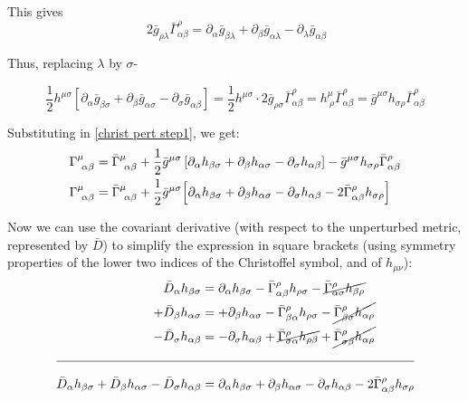 \documentclass[12pt, letterpaper]{report}
\begin{document}
This gives 
$$\ 2\bar{g}_{\rho\lambda}\bar{\Gamma}^{\rho}_{\alpha\beta}= \partial_\alpha \bar{g}_{\beta\lambda}+\partial_{\beta}\bar{g}_{\alpha\lambda}-\partial_{\lambda}\bar{g}_{\alpha\beta}$$ 

Thus, replacing $\lambda$ by $\sigma$-

\[
    \frac{1}{2}h^{\mu\sigma}\left[\partial_\alpha \bar{g}_{\beta\sigma}+\partial_{\beta}\bar{g}_{\alpha\sigma}-\partial_{\sigma}\bar{g}_{\alpha\beta}\right] = \frac{1}{2}h^{\mu\sigma}\cdot 2\bar{g}_{\rho\sigma}\bar{\Gamma}^{\rho}_{\alpha\beta}= h^{\mu}_{\ \rho}\bar{\Gamma}^{\rho}_{\alpha\beta}= \bar{g}^{\mu\sigma} h_{\sigma\rho}\bar{\Gamma}^{\rho}_{\alpha\beta}
\]

Substituting in \cref{christ pert step1}, we get: 
\setlength{\jot}{10pt}
\begin{align} 
    \Gamma^{\mu}_{\ \alpha\beta}&= \bar{\Gamma}^{\mu}_{\ \alpha\beta}+\frac{1}{2}\bar{g}^{\mu\sigma}\left[\partial_\alpha h_{\beta\sigma}+\partial_{\beta}h_{\alpha\sigma}-\partial_{\sigma}h_{\alpha\beta}\right]- \bar{g}^{\mu\sigma} h_{\sigma\rho}\bar{\Gamma}^{\rho}_{\alpha\beta} \nonumber\\
    \Gamma^{\mu}_{\ \alpha\beta}&= \bar{\Gamma}^{\mu}_{\ \alpha\beta}+\frac{1}{2}\bar{g}^{\mu\sigma}\qty[\partial_\alpha h_{\beta\sigma}+\partial_{\beta}h_{\alpha\sigma}-\partial_{\sigma}h_{\alpha\beta}- 2\bar{\Gamma}^{\rho}_{\alpha\beta}h_{\sigma\rho}]\label{christ pert step2}
\end{align}

Now we can use the covariant derivative (with respect to the unperturbed metric, represented by $\bar{D}$) to simplify the expression in square brackets (using symmetry properties of the lower two indices of the Christoffel symbol, and of $h_{\mu\nu}$): 
\setlength{\jot}{10pt}
\begin{align*}
    \bar{D}_{\alpha}h_{\beta\sigma} &= \partial_{\alpha} h_{\beta\sigma}- \bar{\Gamma}^{\rho}_{\alpha\beta}h_{\rho \sigma}- \cancel{\bar{\Gamma}^{\rho}_{\alpha\sigma}h_{\beta\rho}}\\
    +\bar{D}_{\beta}h_{\alpha\sigma} &= +\partial_{\beta} h_{\alpha\sigma}- \bar{\Gamma}^{\rho}_{\beta\alpha}h_{\rho \sigma}- \cancel{\bar{\Gamma}^{\rho}_{\beta\sigma}h_{\alpha\rho}}\\
    -\bar{D}_{\sigma}h_{\alpha\beta} &= -\partial_{\sigma} h_{\alpha\beta}+ \cancel{\bar{\Gamma}^{\rho}_{\sigma\alpha}h_{\rho \beta}}+ \cancel{\bar{\Gamma}^{\rho}_{\sigma\beta}h_{\alpha\rho}}\\
    \noalign{\bigskip\hrule\bigskip}
    \bar{D}_{\alpha}h_{\beta\sigma}+\bar{D}_{\beta}h_{\alpha\sigma}-\bar{D}_{\sigma}h_{\alpha\beta} &= \partial_\alpha h_{\beta\sigma}+\partial_{\beta}h_{\alpha\sigma}-\partial_{\sigma}h_{\alpha\beta}- 2\bar{\Gamma}^{\rho}_{\alpha\beta}h_{\sigma\rho}
\end{align*}
\end{document}
